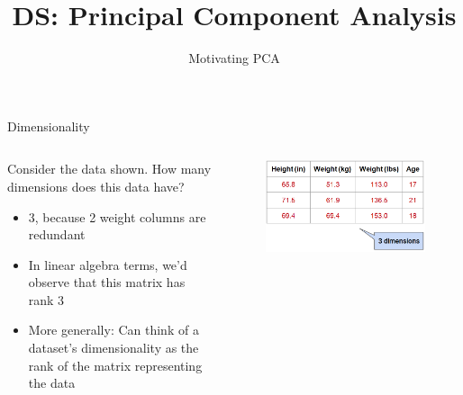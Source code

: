 \documentclass[aspectratio=169]{../latex_main/tntbeamer}  %
\title[Introduction]{DS: Principal Component Analysis}
\subtitle{Motivating PCA}
\begin{document}
	
	\maketitle
	\begin{frame}{Dimensionality}
	    \begin{columns}
	        \begin{column}{.5\textwidth}
	               Consider the data shown. How many dimensions does this data have?
	               \begin{itemize}
	                   \item 3, because 2 weight columns are redundant
	                   \item In linear algebra terms, we’d observe that this matrix has rank 3
	                   \item More generally: Can think of a dataset’s dimensionality as the rank of the matrix representing the data 
	               \end{itemize}
	        \end{column}
	        
	        
	        \begin{column}{.5\textwidth}
	                \begin{figure}
	                    \centering
	                    \includegraphics[scale=.4]{Bild4}
	                \end{figure}
	        \end{column}
	    \end{columns}
	\end{frame}
	
\end{document}
